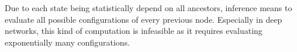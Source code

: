 Due to each state being statistically depend on all ancestors, inference means to evaluate all possible configurations of every previous node.
Especially in deep networks, this kind of computation is infeasible as it requires evaluating exponentially many configurations.\\





%





\newpage
